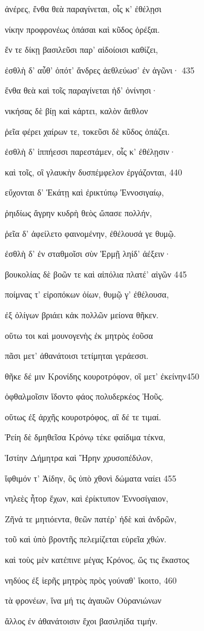 ἀνέρες, ἔνθα θεὰ παραγίνεται, οἷς κ' ἐθέλῃσι

νίκην προφρονέως ὀπάσαι καὶ κῦδος ὀρέξαι.

ἔν τε δίκῃ βασιλεῦσι παρ' αἰδοίοισι καθίζει,

ἐσθλὴ δ' αὖθ' ὁπότ' ἄνδρες ἀεθλεύωσ' ἐν ἀγῶνι· 435

ἔνθα θεὰ καὶ τοῖς παραγίνεται ἠδ' ὀνίνησι· 

νικήσας δὲ βίῃ καὶ κάρτει, καλὸν ἄεθλον 

ῥεῖα φέρει χαίρων τε, τοκεῦσι δὲ κῦδος ὀπάζει.

ἐσθλὴ δ' ἱππήεσσι παρεστάμεν, οἷς κ' ἐθέλῃσιν·

καὶ τοῖς, οἳ γλαυκὴν δυσπέμφελον ἐργάζονται, 440

εὔχονται δ' Ἑκάτῃ καὶ ἐρικτύπῳ Ἐννοσιγαίῳ,

ῥηιδίως ἄγρην κυδρὴ θεὸς ὤπασε πολλήν,

ῥεῖα δ' ἀφείλετο φαινομένην, ἐθέλουσά γε θυμῷ.

ἐσθλὴ δ' ἐν σταθμοῖσι σὺν Ἑρμῇ ληίδ' ἀέξειν· 

βουκολίας δὲ βοῶν τε καὶ αἰπόλια πλατέ' αἰγῶν 445

ποίμνας τ' εἰροπόκων ὀίων, θυμῷ γ' ἐθέλουσα,

ἐξ ὀλίγων βριάει κἀκ πολλῶν μείονα θῆκεν.

οὕτω τοι καὶ μουνογενὴς ἐκ μητρὸς ἐοῦσα

πᾶσι μετ' ἀθανάτοισι τετίμηται γεράεσσι. 

θῆκε δέ μιν Κρονίδης κουροτρόφον, οἳ μετ' ἐκείνην450

ὀφθαλμοῖσιν ἴδοντο φάος πολυδερκέος Ἠοῦς.

οὕτως ἐξ ἀρχῆς κουροτρόφος, αἳ δέ τε τιμαί.

Ῥείη δὲ δμηθεῖσα Κρόνῳ τέκε φαίδιμα τέκνα, 

Ἱστίην Δήμητρα καὶ Ἥρην χρυσοπέδιλον, 

ἴφθιμόν τ' Ἀίδην, ὃς ὑπὸ χθονὶ δώματα ναίει 455

νηλεὲς ἦτορ ἔχων, καὶ ἐρίκτυπον Ἐννοσίγαιον,

Ζῆνά τε μητιόεντα, θεῶν πατέρ' ἠδὲ καὶ ἀνδρῶν,

τοῦ καὶ ὑπὸ βροντῆς πελεμίζεται εὐρεῖα χθών.

καὶ τοὺς μὲν κατέπινε μέγας Κρόνος, ὥς τις ἕκαστος

νηδύος ἐξ ἱερῆς μητρὸς πρὸς γούναθ' ἵκοιτο, 460

τὰ φρονέων, ἵνα μή τις ἀγαυῶν Οὐρανιώνων

ἄλλος ἐν ἀθανάτοισιν ἔχοι βασιληίδα τιμήν.

